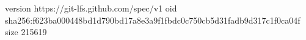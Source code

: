 version https://git-lfs.github.com/spec/v1
oid sha256:f623ba000448bd1d790bd17a8e3a9f1fbdc0c750cb5d31fadb9d317c1f0ca04f
size 215619
